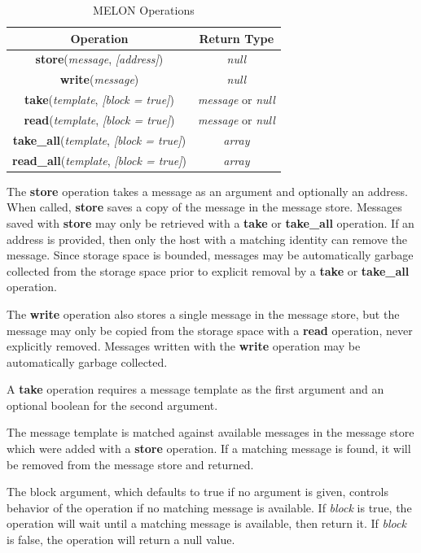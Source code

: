 \documentclass[lnicst]{svmultln}
\begin{document}
\begin{table}
\centering
\begin{tabular}{|c|c|}
\hline
\textbf{Operation} & \textbf{Return Type} \\ \hline
\textbf{store}(\textit{message}, \textit{[address]}) & \textit{null} \\ \hline
\textbf{write}(\textit{message}) & \textit{null} \\ \hline
\textbf{take}(\textit{template}, \textit{[block = true]}) & \textit{message} or \textit{null} \\ \hline
\textbf{read}(\textit{template}, \textit{[block = true]}) & \textit{message} or \textit{null} \\ \hline
\textbf{take\_all}(\textit{template}, \textit{[block = true]}) & \textit{array} \\ \hline
\textbf{read\_all}(\textit{template}, \textit{[block = true]}) & \textit{array} \\ \hline
\end{tabular}
\caption{MELON Operations}
\end{table}

The \textbf{store} operation takes a message as an argument and optionally an address. When called, \textbf{store} saves a copy of the message in the message store. Messages saved with \textbf{store} may only be retrieved with a \textbf{take} or \textbf{take\_all} operation. If an address is provided, then only the host with a matching identity can remove the message. Since storage space is bounded, messages may be automatically garbage collected from the storage space prior to explicit removal by a \textbf{take} or \textbf{take\_all} operation.

The \textbf{write} operation also stores a single message in the message store, but the message may only be copied from the storage space with a \textbf{read} operation, never explicitly removed. Messages written with the \textbf{write} operation may be automatically garbage collected.

A \textbf{take} operation requires a message template as the first argument and an optional boolean for the second argument.

The message template is matched against available messages in the message store which were added with a \textbf{store} operation. If a matching message is found, it will be removed from the message store and returned.

The block argument, which defaults to true if no argument is given, controls behavior of the operation if no matching message is available. If \textit{block} is true, the operation will wait until a matching message is available, then return it. If \textit{block} is false, the operation will return a null value.
\end{document}
